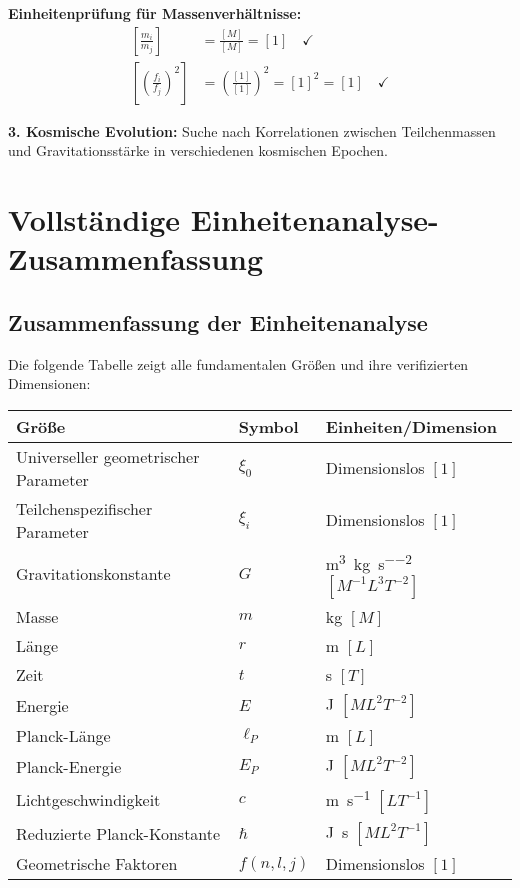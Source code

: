 \documentclass[12pt,a4paper]{article}
\newcommand{\xifunc}{f(n,l,j)}
\theoremstyle{definition}
\begin{document}
	\textbf{Einheitenprüfung für Massenverhältnisse:}
	\begin{align}
		\left[\frac{m_i}{m_j}\right] &= \frac{[M]}{[M]} = [1] \quad \checkmark \\
		\left[\left(\frac{f_i}{f_j}\right)^2\right] &= \left(\frac{[1]}{[1]}\right)^2 = [1]^2 = [1] \quad \checkmark
	\end{align}
	
	\textbf{3. Kosmische Evolution:}
	Suche nach Korrelationen zwischen Teilchenmassen und Gravitationsstärke in verschiedenen kosmischen Epochen.
	
	\section{Vollständige Einheitenanalyse-Zusammenfassung}
	
	\subsection{Zusammenfassung der Einheitenanalyse}
	
	Die folgende Tabelle zeigt alle fundamentalen Größen und ihre verifizierten Dimensionen:
	
	\begin{center}
		\begin{tabular}{lll}
			\toprule
			\textbf{Größe} & \textbf{Symbol} & \textbf{Einheiten/Dimension} \\
			\midrule
			Universeller geometrischer Parameter & $\xi_0$ & Dimensionslos $[1]$ \\
			Teilchenspezifischer Parameter & $\xi_i$ & Dimensionslos $[1]$ \\
			Gravitationskonstante & $G$ & \si{\metre\cubed\per\kilogram\per\second\squared} $[M^{-1}L^3T^{-2}]$ \\
			Masse & $m$ & \si{\kilogram} $[M]$ \\
			Länge & $r$ & \si{\metre} $[L]$ \\
			Zeit & $t$ & \si{\second} $[T]$ \\
			Energie & $E$ & \si{\joule} $[ML^2T^{-2}]$ \\
			Planck-Länge & $\ell_P$ & \si{\metre} $[L]$ \\
			Planck-Energie & $E_P$ & \si{\joule} $[ML^2T^{-2}]$ \\
			Lichtgeschwindigkeit & $c$ & \si{\metre\per\second} $[LT^{-1}]$ \\
			Reduzierte Planck-Konstante & $\hbar$ & \si{\joule\second} $[ML^2T^{-1}]$ \\
			Geometrische Faktoren & $\xifunc$ & Dimensionslos $[1]$ \\
			\bottomrule
		\end{tabular}
	\end{center}
	
\end{document}
